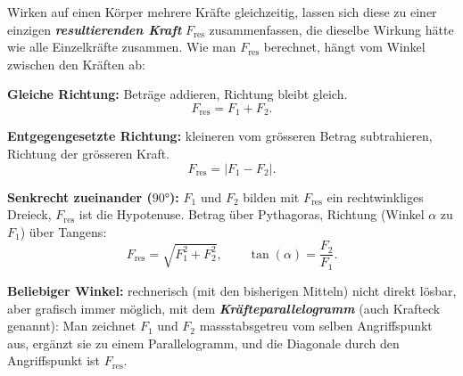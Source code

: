 \documentclass[addpoints,11pt,a4paper]{exam}
\begin{document}
\begin{theoriebox}
Wirken auf einen Körper mehrere Kräfte gleichzeitig, lassen sich diese zu
einer einzigen \textbf{\emph{resultierenden Kraft}} $F_{\text{res}}$
zusammenfassen, die dieselbe Wirkung hätte wie alle Einzelkräfte
zusammen. Wie man $F_{\text{res}}$ berechnet, hängt vom Winkel zwischen
den Kräften ab:

\textbf{Gleiche Richtung:} Beträge addieren, Richtung bleibt gleich.
\[
  F_{\text{res}} = F_1 + F_2.
\]

\textbf{Entgegengesetzte Richtung:} kleineren vom grösseren Betrag
subtrahieren, Richtung der grösseren Kraft.
\[
  F_{\text{res}} = \lvert F_1 - F_2\rvert.
\]

\textbf{Senkrecht zueinander ($\ang{90}$):} $F_1$ und $F_2$ bilden mit
$F_{\text{res}}$ ein rechtwinkliges Dreieck, $F_{\text{res}}$ ist die
Hypotenuse. Betrag über Pythagoras, Richtung (Winkel $\alpha$ zu $F_1$)
über Tangens:
\[
  \boxed{F_{\text{res}} = \sqrt{F_1^2+F_2^2}}, \qquad
  \boxed{\tan(\alpha) = \frac{F_2}{F_1}}.
\]

\textbf{Beliebiger Winkel:} rechnerisch (mit den bisherigen Mitteln) nicht
direkt lösbar, aber grafisch immer möglich, mit dem
\textbf{\emph{Kräfteparallelogramm}} (auch Krafteck genannt): Man zeichnet
$F_1$ und $F_2$ massstabsgetreu vom selben Angriffspunkt aus, ergänzt sie
zu einem Parallelogramm, und die Diagonale durch den Angriffspunkt ist
$F_{\text{res}}$.


\end{theoriebox}
\end{document}
